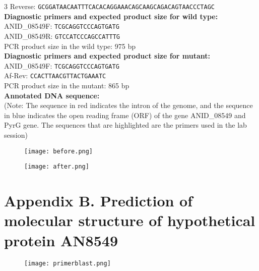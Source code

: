\documentclass[a4paper,10pt]{article}
\begin{document}
\begin{appendices}
3 Reverse: \texttt{GCGGATAACAATTTCACACAGGAAACAGCAAGCAGACAGTAACCCTAGC}\\
\textbf{Diagnostic primers and expected product size for wild type:}\\
ANID\_08549F: \texttt{TCGCAGGTCCCAGTGATG}\\
ANID\_08549R: \texttt{GTCCATCCCAGCCATTTG}\\
PCR product size in the wild type: 975 bp\\
\textbf{Diagnostic primers and expected product size for mutant:}\\
ANID\_08549F: \texttt{TCGCAGGTCCCAGTGATG}\\
Af-Rev: \texttt{CCACTTAACGTTACTGAAATC}\\
PCR product size in the mutant: 865 bp\\
\textbf{Annotated DNA sequence:}\\
(Note: The sequence in red indicates the intron of the genome, and the sequence in blue indicates the open reading frame (ORF) of the gene ANID\_08549 and PyrG gene. The sequences that are highlighted are the primers used in the lab session)
\begin{figure}[H]
\centering
\texttt{[image: before.png]}
\end{figure}

\begin{figure}[H]
\centering
\texttt{[image: after.png]}
\end{figure}


\section*{Appendix B. Prediction of molecular structure of hypothetical protein AN8549}\label{secB}

\begin{figure}[H]
\centering
\texttt{[image: primerblast.png]}
\end{figure}



\end{appendices}
\end{document}
